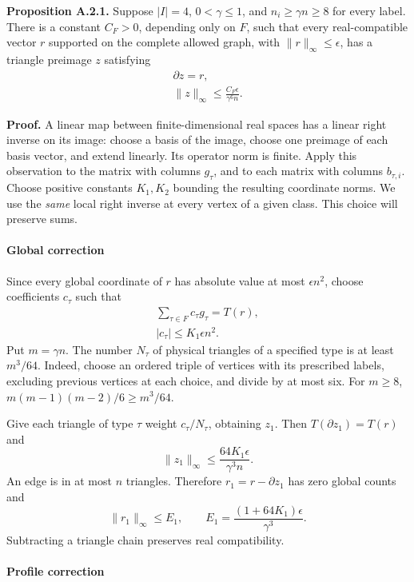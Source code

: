 \documentclass[english,11pt,a4paper]{article}
\begin{document}
\textbf{Proposition A.2.1.} Suppose \(|I|=4\), \(0<\gamma\le1\), and \(n_i\ge\gamma n\ge8\) for every label. There is a constant \(C_F>0\), depending only on \(F\), such that every real-compatible vector \(r\) supported on the complete allowed graph, with \(\|r\|_\infty\le\epsilon\), has a triangle preimage \(z\) satisfying \[\begin{gathered}
\partial z=r,\\
\|z\|_\infty\le \frac{C_F\epsilon}{\gamma^6n}.
\end{gathered}
\tag{A.2.1}\]

\textbf{Proof.} A linear map between finite-dimensional real spaces has a linear right inverse on its image: choose a basis of the image, choose one preimage of each basis vector, and extend linearly. Its operator norm is finite. Apply this observation to the matrix with columns \(g_\tau\), and to each matrix with columns \(b_{\tau,i}\). Choose positive constants \(K_1,K_2\) bounding the resulting coordinate norms. We use the \emph{same} local right inverse at every vertex of a given class. This choice will preserve sums.

\paragraph{Global correction}\label{global-correction}

Since every global coordinate of \(r\) has absolute value at most \(\epsilon n^2\), choose coefficients \(c_\tau\) such that \[\begin{gathered}
\sum_{\tau\in F}c_\tau g_\tau=T(r),\\
|c_\tau|\le K_1\epsilon n^2.
\end{gathered}\] Put \(m=\gamma n\). The number \(N_\tau\) of physical triangles of a specified type is at least \(m^3/64\). Indeed, choose an ordered triple of vertices with its prescribed labels, excluding previous vertices at each choice, and divide by at most six. For \(m\ge8\), \(m(m-1)(m-2)/6\ge m^3/64\).

Give each triangle of type \(\tau\) weight \(c_\tau/N_\tau\), obtaining \(z_1\). Then \(T(\partial z_1)=T(r)\) and \[\|z_1\|_\infty\le\frac{64K_1\epsilon}{\gamma^3n}.\] An edge is in at most \(n\) triangles. Therefore \(r_1=r-\partial z_1\) has zero global counts and \[\|r_1\|_\infty\le E_1,
\qquad E_1=\frac{(1+64K_1)\epsilon}{\gamma^3}.
\tag{A.2.2}\] Subtracting a triangle chain preserves real compatibility.

\paragraph{Profile correction}\label{profile-correction}
\end{document}
